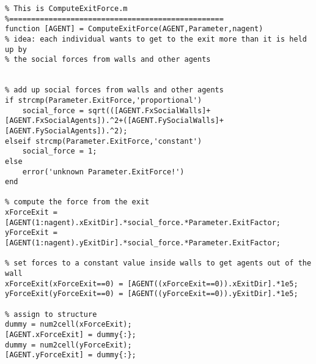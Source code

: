\lstset{basicstyle=\footnotesize\ttfamily}
    
\begin{lstlisting}[breaklines]
%=================================================
% This is ComputeExitForce.m
%=================================================
function [AGENT] = ComputeExitForce(AGENT,Parameter,nagent)
% idea: each individual wants to get to the exit more than it is held up by
% the social forces from walls and other agents


% add up social forces from walls and other agents
if strcmp(Parameter.ExitForce,'proportional')
    social_force = sqrt(([AGENT.FxSocialWalls]+[AGENT.FxSocialAgents]).^2+([AGENT.FySocialWalls]+[AGENT.FySocialAgents]).^2);
elseif strcmp(Parameter.ExitForce,'constant')
    social_force = 1;
else
    error('unknown Parameter.ExitForce!')
end

% compute the force from the exit
xForceExit = [AGENT(1:nagent).xExitDir].*social_force.*Parameter.ExitFactor;
yForceExit = [AGENT(1:nagent).yExitDir].*social_force.*Parameter.ExitFactor;

% set forces to a constant value inside walls to get agents out of the wall
xForceExit(xForceExit==0) = [AGENT((xForceExit==0)).xExitDir].*1e5;
yForceExit(yForceExit==0) = [AGENT((yForceExit==0)).yExitDir].*1e5;

% assign to structure
dummy = num2cell(xForceExit);
[AGENT.xForceExit] = dummy{:};
dummy = num2cell(yForceExit);
[AGENT.yForceExit] = dummy{:};
\end{lstlisting}